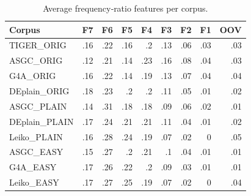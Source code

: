 \begin{table}[htbp]
\centering
\begin{tabular}{lrrrrrrrr}
\toprule
Corpus & F7 & F6 & F5 & F4 & F3 & F2 & F1 & OOV \\ \hline
TIGER\_ORIG & .16 & .22 & .16 & .2 & .13 & .06 & .03 & .03 \\
ASGC\_ORIG & .12 & .21 & .14 & .23 & .16 & .08 & .04 & .03 \\
G4A\_ORIG & .16 & .22 & .14 & .19 & .13 & .07 & .04 & .04 \\
DEplain\_ORIG & .18 & .23 & .2 & .2 & .11 & .05 & .01 & .02 \\
ASGC\_PLAIN & .14 & .31 & .18 & .18 & .09 & .06 & .02 & .01 \\
DEplain\_PLAIN & .17 & .24 & .21 & .21 & .11 & .04 & .01 & .02 \\
Leiko\_PLAIN & .16 & .28 & .24 & .19 & .07 & .02 & 0 & .05 \\
ASGC\_EASY & .15 & .27 & .2 & .21 & .1 & .04 & .01 & .01 \\
G4A\_EASY & .17 & .26 & .22 & .2 & .09 & .03 & .01 & .01 \\
Leiko\_EASY & .17 & .27 & .25 & .19 & .07 & .02 & 0 & .04 \\
\bottomrule
\end{tabular}
\caption{Average frequency‑ratio features per corpus.}
\label{tab:freq_ratios}
\end{table}
